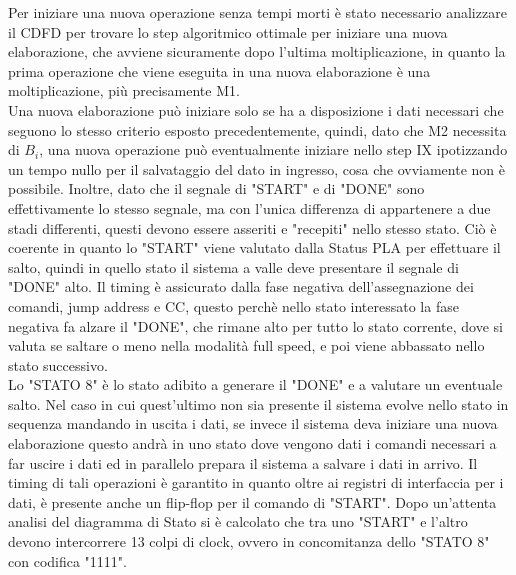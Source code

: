 \documentclass[a4paper, titlepage]{article}
\begin{document}
Per iniziare una nuova operazione senza tempi morti è stato necessario analizzare il CDFD per trovare lo step algoritmico ottimale per iniziare una nuova elaborazione, che avviene sicuramente dopo l'ultima moltiplicazione, in quanto la prima operazione che viene eseguita in una nuova elaborazione è una moltiplicazione, più precisamente M1.\\ Una nuova elaborazione può iniziare solo se ha a disposizione i dati necessari che seguono lo stesso criterio esposto precedentemente, quindi, dato che M2 necessita di $B_{i}$, una nuova operazione può eventualmente iniziare nello step IX ipotizzando un tempo nullo per il salvataggio del dato in ingresso, cosa che ovviamente non è possibile. Inoltre, dato che il segnale di "START" e di "DONE" sono effettivamente lo stesso segnale, ma con l'unica differenza di appartenere a due stadi differenti, questi devono essere asseriti e "recepiti" nello stesso stato. Ciò è coerente in quanto lo "START" viene valutato dalla Status PLA per effettuare il salto, quindi in quello stato il sistema a valle deve presentare il segnale di "DONE" alto. Il timing è assicurato dalla fase negativa dell'assegnazione dei comandi, jump address e CC, questo perchè nello stato interessato la fase negativa fa alzare il "DONE", che rimane alto per tutto lo stato corrente, dove si valuta se saltare o meno nella modalità full speed, e poi viene abbassato nello stato successivo.\\ Lo "STATO 8" è lo stato adibito a generare il "DONE" e a valutare un eventuale salto. Nel caso in cui quest'ultimo non sia presente il sistema evolve nello stato in sequenza mandando in uscita i dati, se invece il sistema deva iniziare una nuova elaborazione questo andrà in uno stato dove vengono dati i comandi necessari a far uscire i dati ed in parallelo prepara il sistema a salvare i dati in arrivo. Il timing di tali operazioni è garantito in quanto oltre ai registri di interfaccia per i dati, è presente anche un flip-flop per il comando di "START". Dopo un'attenta analisi del diagramma di Stato si è calcolato che tra uno "START" e l'altro devono intercorrere 13 colpi di clock, ovvero in concomitanza dello "STATO 8" con codifica "1111".
\end{document}
